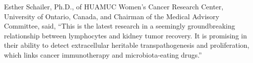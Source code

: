 \documentclass{article}
\begin{document}
Esther Schailer, Ph.D., of HUAMUC Women’s Cancer Research Center, University of Ontario, Canada, and Chairman of the Medical Advisory Committee, said, “This is the latest research in a seemingly groundbreaking relationship between lymphocytes and kidney tumor recovery. It is promising in their ability to detect extracellular heritable transpathogenesis and proliferation, which links cancer immunotherapy and microbiota-eating drugs.”
\end{document}
